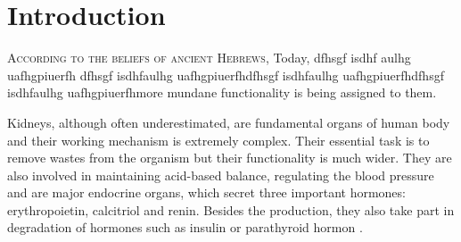 	\setcounter{page}{1}
	
\chapter*{Introduction}
	
\lettrine[lines=3, slope=0.9em, findent=-1em]{A}{ccording to the beliefs of ancient Hebrews}, Today, dfhsgf isdhf aulhg uafhgpiuerfh  dfhsgf isdhfaulhg uafhgpiuerfhdfhsgf isdhfaulhg uafhgpiuerfhdfhsgf isdhfaulhg uafhgpiuerfhmore mundane functionality is being assigned to them. 

Kidneys, although often underestimated, are fundamental organs of human body and their working mechanism is extremely complex. Their essential task is to remove wastes from the organism but their functionality is much wider. They are also involved in maintaining acid-based balance, regulating the blood pressure and are major endocrine organs, which secret three important hormones: erythropoietin, calcitriol and renin. Besides the production, they also take part in degradation of hormones such as insulin or parathyroid hormon \cite{saladin}.